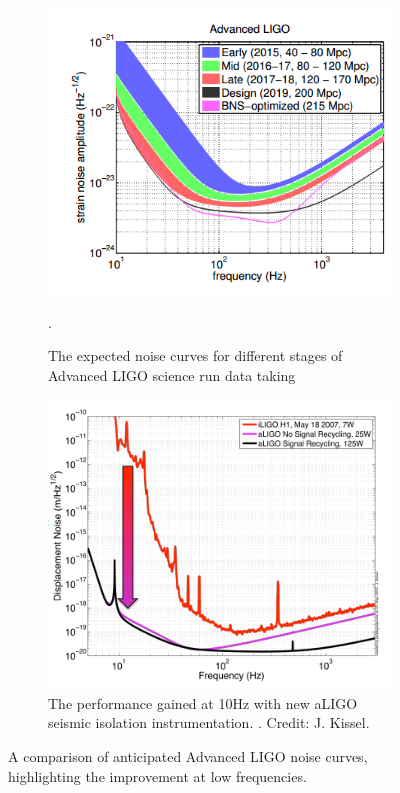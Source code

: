\begin{figure} 
\centering
\begin{subfigure}{.48\textwidth}
  \centering
  \includegraphics[width=\linewidth]{figures/aLIGO_noise_curve.png}
  \caption{The expected noise curves for different stages of Advanced LIGO science run data taking \cite{aLIGOoutlook}}. 
  \label{fig:aLIGO_noise}
\end{subfigure}%
\quad
\begin{subfigure}{.48\textwidth}
  \centering
  \includegraphics[width=\linewidth]{figures/aLIGO_performance_gain.png}
  \caption{The performance gained at 10Hz with new aLIGO seismic isolation instrumentation. \cite{KisselThesis}. Credit: J. Kissel.} 
  \label{fig:SEISUSgain}
\end{subfigure}
\caption{A comparison of anticipated Advanced LIGO noise curves, highlighting the improvement at low frequencies.}
\label{fig:aLIGO} 
\end{figure}

